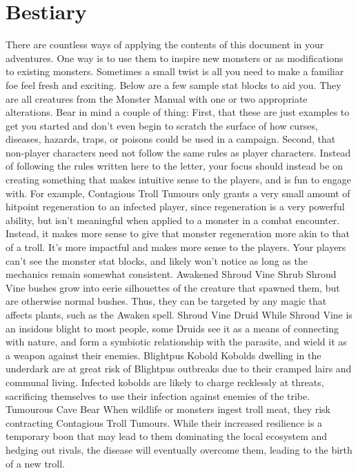\documentclass[10pt,a4paper,twoside,twocolumn,openany,bg=print,nodeprecatedcode]{dndbook}
\begin{document}
\chapter{Bestiary}
There are countless ways of applying the contents of this document in your adventures. One way is to use them to inspire new monsters or as modifications to existing monsters. Sometimes a small twist is all you need to make a familiar foe feel fresh and exciting. Below are a few sample stat blocks to aid you. They are all creatures from the Monster Manual with one or two appropriate alterations. Bear in mind a couple of thing: First, that these are just examples to get you started and don't even begin to scratch the surface of how curses, diseases, hazards, traps, or poisons could be used in a campaign. Second, that non-player characters need not follow the same rules as player characters. Instead of following the rules written here to the letter, your focus should instead be on creating something that makes intuitive sense to the players, and is fun to engage with. For example, Contagious Troll Tumours only grants a very small amount of hitpoint regeneration to an infected player, since regeneration is a very powerful ability, but isn't meaningful when applied to a monster in a combat encounter. Instead, it makes more sense to give that monster regeneration more akin to that of a troll. It's more impactful and makes more sense to the players. Your players can't see the monster stat blocks, and likely won't notice as long as the mechanics remain somewhat consistent.
Awakened Shroud Vine Shrub
Shroud Vine bushes grow into eerie silhouettes of the creature that spawned them, but are otherwise normal bushes. Thus, they can be targeted by any magic that affects plants, such as the Awaken spell.
Shroud Vine Druid
While Shroud Vine is an insidous blight to most people, some Druids see it as a means of connecting with nature, and form a symbiotic relationship with the parasite, and wield it as a weapon against their enemies.
Blightpus Kobold
Kobolds dwelling in the underdark are at great risk of Blightpus outbreaks due to their cramped lairs and communal living. Infected kobolds are likely to charge recklessly at threats, sacrificing themselves to use their infection against enemies of the tribe.
Tumourous Cave Bear
When wildlife or monsters ingest troll meat, they risk contracting Contagious Troll Tumours. While their increased resilience is a temporary boon that may lead to them dominating the local ecosystem and hedging out rivals, the disease will eventually overcome them, leading to the birth of a new troll. 
\end{document}
